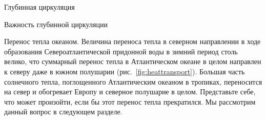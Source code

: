 \begin{chapter}{Глубинная циркуляция}
\begin{section}{Важность глубинной циркуляции}
\begin{paragraph}{Перенос тепла океаном.}
Величина переноса тепла в северном направлении в ходе
образования Североатлантической придонной воды в зимний период столь велико,
что суммарный перенос тепла в Атлантическом океане в целом направлен к северу
даже в южном полушарии (рис.~\ref{fig:heattransport}). Большая часть солнечного
тепла, поглощенного Атлантическим океаном в тропиках, переносится на север
и обогревает Европу и северное полушарие в целом. Представьте себе, что может
произойти, если бы этот перенос тепла прекратился. Мы рассмотрим данный вопрос
в следующем разделе.
%


\end{paragraph}
\end{section}
\end{chapter}
